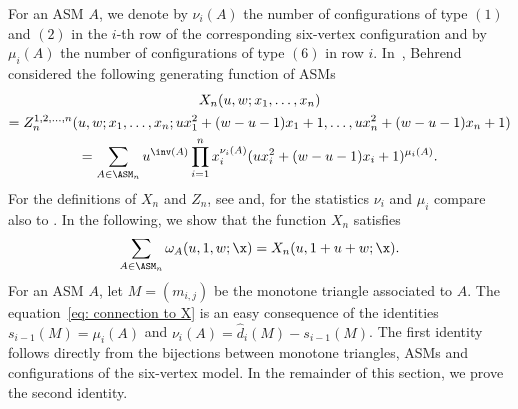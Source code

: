 For an ASM $A$, we denote by $\nu_i(A)$ the number of configurations of type $(1)$ and $(2)$ in the $i$-th row of the corresponding six-vertex configuration and by $\mu_i(A)$ the number of configurations of type $(6)$ in row $i$. 
In~\cite{Behrend13}, Behrend considered the following generating function of ASMs
\begin{multline*}
X_n(u,w;x_1,\ldots,x_n)\\
 = Z_n^{1,2,\ldots,n}(u,w;x_1,\ldots,x_n;u x_1^2 + (w-u-1)x_1+1, \ldots, 	u x_n^2 + (w-u-1)x_n+1) \\
= \sum_{A \in \ASM_n} u^{\inv(A)} \prod_{i=1}^n x_i^{\nu_i(A)} (u x_i^2 + (w-u-1)x_i+1)^{\mu_i(A)}. 
\end{multline*}
For the definitions of $X_n$ and $Z_n$, see \cite[Eqs. 67, 70, 73]{Behrend13} and, for the statistics $\nu_i$ and $\mu_i$ compare also to \cite[Eqs. 113, 2]{Behrend13}. In the following, we show that the function $X_n$ satisfies
\begin{equation}
\label{eq: connection to X}
\sum_{A \in \ASM_n}  \omega_A(u,1,w;\x)  = X_n(u,1+u+w;\x).
\end{equation}
For an ASM $A$, let $M=(m_{i,j})$ be the monotone triangle associated to $A$. The equation~\eqref{eq: connection to X} is an easy consequence of the identities $s_{i-1}(M)=\mu_i(A)$ and $\nu_i(A) = \widehat{d}_i(M)-s_{i-1}(M)$. The first identity follows directly from the bijections between monotone triangles, ASMs and configurations of the six-vertex model. In the remainder of this section, we prove the second identity.


